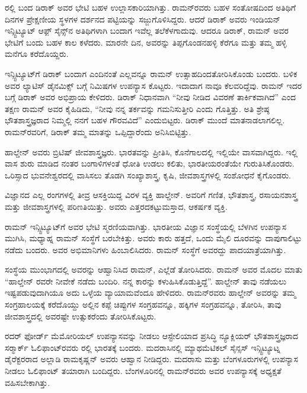 
ರಲ್ಲಿ ಬಂದ ಡಿರಾಕ್ ಅವರ ಭೇಟಿ ಬಹಳ ಉಲ್ಲಾಸಕಾರಿಯಾಗಿತ್ತು. ರಾಮನ್‍ರವರು ಬಹಳ ಸಂತೋಷದಿಂದ ಅತಿಥಿಗೆ \enginline{-}ದಿನಗಳ ಪ್ರೇಕ್ಷಣೀಯ ಸ್ಥಳಗಳ ದರ್ಶನದ ಪಟ್ಟಿಯನ್ನು ಸಜ್ಜುಗೊಳಿಸಿದ್ದರು. ಆದರೆ ಡಿರಾಕ್ ಅವರು ಇಂಡಿಯನ್ ಇನ್ಸ್ಟಿಟ್ಯೂಟ್ ಆಫ಼್ ಸೈನ್ಸ್‌ನ ಅತಿಥಿಗಳಾಗಿ ಬಂದಾಗ ಇವೆಲ್ಲ ತಲೆಕೆಳಗಾದುವು. ಆದರೂ ಡಿರಾಕ್, ರಾಮನ್ ಅವರ ಭೇಟಿಗೆ ಬಂದು ಬಹಳ ಕಾಲ ಕಳೆದರು. ಮಾರನೇ ದಿನ, ಅವರನ್ನು ತಿಪ್ಪಗೊಂಡನಹಳ್ಳಿ ಕೆರೆಗೂ ಮತ್ತು ತಮ್ಮ ಹಳ್ಳಿ ಮನೆಗೂ ಕರೆದೊಯ್ದರು.

ಇನ್ಸ್ಟಿಟ್ಯೂಟ್‍ಗೆ ಡಿರಾಕ್ ಬಂದಾಗ ಎಂದಿನಂತೆ ಎಲ್ಲವನ್ನೂ ರಾಮನ್ ಉತ್ಸಾಹದಿಂದ\break ತೋರಿಸಿಕೊಂಡು ಬಂದರು. ಬಳಿಕ ಅವರ ಲ್ಯಾಟಿಸ್ ಡೈನಮಿಕ್ಸ್ ಬಗ್ಗೆ  ನಿಮಿಷಗಳ ಉಪನ್ಯಾಸ ಕೊಟ್ಟರು. ಇದಾದಾಗ ನಾವೂ ಕೆಲವರಿದ್ದೆವು. ರಾಮನ್ ಇದರ ಬಗ್ಗೆ ಡಿರಾಕ್ ಅವರ ಅಭಿಪ್ರಾಯ ಕೇಳಿದರು. ಡಿರಾಕ್ ನಿಧಾನವಾಗಿ “ನೀವು ನೀಡಿದ ವಿವರಣೆ ತಾರ್ಕಿಕವಾಗಿದೆ” ಎಂದ ತಕ್ಷಣ ರಾಮನ್ ಅವರ ಕೈಹಿಡಿದು, “ನೀವು ನನ್ನ ತರ್ಕವನ್ನು ಗಮನಿಸುತ್ತೀರಿ ಎಂದು ಗೊತ್ತಿತ್ತು. ಅತಿ ಶ್ರೇಷ್ಠ ಭೌತಶಾಸ್ತ್ರಜ್ಞರಾದ ನಿಮ್ಮಲ್ಲಿ ನನಗೆ ಬಹಳ ಗೌರವವಿದೆ” ಎಂದುಬಿಟ್ಟರು. ಡಿರಾಕ್ ಮುಂದೆ ಮಾತನಾಡಲಾಗಲಿಲ್ಲ. ರಾಮನ್‍ರವರಿಗೆ, ಡಿರಾಕ್ ತಮ್ಮ ಮಾತನ್ನು ಒಪ್ಪಿದ್ದಾರೆಂದು ಅನಿಸಿಬಿಟ್ಟಿತ್ತು.



ಹಾಲ್ಡೇನ್ ಅವರು ಬ್ರಿಟಿಷ್ ಜೀವಶಾಸ್ತ್ರಜ್ಞರು. ಭಾರತವನ್ನು ಪ್ರೀತಿಸಿ, ಕೊನೆಗಾಲದಲ್ಲಿ ಇಲ್ಲಿಯೇ ವಾಸವಾಗಿದ್ದರು. ಇಲ್ಲಿ ವಾಸ ಶುರು ಮಾಡಿದ ನಂತರ ಬಂಗಾಳಿಗಳಂತೆ ಧೋತಿ ಉಡಲು ಕಲಿತು, ಭಾರತೀಯರಂತೆಯೇ ಗುರುತಿಸಿಕೊಂಡರು. ಒರಿಸ್ಸಾದ ಭುವನೇಶ್ವರದಲ್ಲಿ ವಾಸಿಸಲು ತೊಡಗಿ ಸಂಖ್ಯಾಶಾಸ್ತ್ರ, ಕೃಷಿ, ಜೀವಶಾಸ್ತ್ರಗಳಲ್ಲಿ ಸಂಶೋಧನೆ ಕೈಗೊಂಡರು.

ವಿಜ್ಞಾನದ ಎಲ್ಲ ರಂಗಗಳಲ್ಲಿ ತೀವ್ರ ಆಸಕ್ತಿಯಿದ್ದ ವಿರಳ ವ್ಯಕ್ತಿ ಹಾಲ್ಡೇನ್. ಅವರಿಗೆ ಗಣಿತ, ಭೌತಶಾಸ್ತ್ರ, ರಸಾಯನಶಾಸ್ತ್ರ ಮತ್ತು ಜೀವಶಾಸ್ತ್ರಗಳಲ್ಲಿ ಪರಿಣತಿಯಿತ್ತು. ಅವರು ಎತ್ತರದ\break ಕಟ್ಟುಮಸ್ತಾದ, ಆಕರ್ಷಕ ವ್ಯಕ್ತಿ.

ರಾಮನ್ ಇನ್ಸ್ಟಿಟ್ಯೂಟ್‍ಗೆ ಅವರ ಭೇಟಿ ಸ್ಮರಣಿಯವಾಗಿತ್ತು. ಭಾರತೀಯ ವಿಜ್ಞಾನ ಸಂಸ್ಥೆಯಲ್ಲಿ ಬೆಳಗಿನ ಉಪನ್ಯಾಸ ಮುಗಿಸಿ, ಮಧ್ಯಾಹ್ನ ರಾಮನ್ ಸಂಸ್ಥೆಗೆ ಬರಬೇಕಿತ್ತು. ಅವರು ಕಾರು ಹತ್ತದೆ, ಒಂದು ಮೈಲಿ ದೂರವನ್ನು ದಾಪುಗಾಲಿಟ್ಟು ನಡೆದು ಬಂದರು. ಅವರ ಅಭಿಮಾನಿಗಳು ಹಿಂಬಾಲಿಸಿದರು. ರಾಮನ್ ಸಂಸ್ಥೆಗೆ ಅವರದ್ದು ಪಾದಯಾತ್ರೆಯಾಗಿತ್ತು.

ಸಂಸ್ಥೆಯ ಮುಂಭಾಗದಲ್ಲಿ ಅವರನ್ನು ಆಹ್ವಾನಿಸಿದ ರಾಮನ್, ಎಲ್ಲೆಡೆ ತೋರಿಸಿದರು. ರಾಮನ್ ಅವರ ಮೊದಲ ಮಾತು “ಹಾಲ್ಡೇನ್ ರವರೇ ನೀವೇಕೆ ನಡೆದು ಬಂದಿರಿ. ನನ್ನ ಕಾರನ್ನು ಕಳುಹಿಸಿಕೊಡುತ್ತಿದ್ದೆ”. ಹಾಲ್ಡೇನ್ ತಾವು ನಡೆಯಲು ಇಷ್ಟಪಡುವುದಾಗಿಯೂ ಅದು ಒಳ್ಳೆಯ ವ್ಯಾಯಾಮವೆಂದೂ ಹೇಳಿದರು. ರಾಮನ್‍ರವರು ಹಾಲ್ಡೇನ್ ಅವರನ್ನು ತಮ್ಮ ಸಂಗ್ರಹಾಲಯಕ್ಕೆ ಕರೆದೊಯ್ದು ಅಲ್ಲಿನ ಕಪ್ಪೆ ಚಿಪ್ಪುಗಳ ಸಂಗ್ರಹವನ್ನೂ, ಹಕ್ಕಿಗಳ ಸಂಗ್ರಹವನ್ನೂ, ತೋರಿಸಿ, ತಾವು ಜೀವಶಾಸ್ತ್ರದಲ್ಲಿ ಅವರಷ್ಟೇ ಉತ್ಸುಕರೆಂದು ತೋರಿಸಿಕೊಟ್ಟರು.



ರದರ್ ಫೋರ್ಡ್ ಮೆಮೋರಿಯಲ್ ಉಪನ್ಯಾಸವನ್ನು ನೀಡಲು ಆಸ್ಟೇಲಿಯಾದ ಪ್ರಸಿದ್ಧಿ ನ್ಯೂಕ್ಲಿಯರ್ ಭೌತಶಾಸ್ತ್ರಜ್ಞರಾದ ಸರ್‍ಮಾರ್ಕ್ ಓಲಿಫಾಂಟ್‍ರವರು ರಲ್ಲಿ ಭಾರತಕ್ಕೆ ಬಂದರು. ಮದರಾಸಿನಲ್ಲಿ ಮ್ಯಾಥಮೆಟಿಕಲ್ ಸೈನ್ಸಸ್ ಇನ್ಸ್ಟಿಟ್ಯೂಟ್ನ ಡೈರೆಕ್ಟರರಾದ ಅಲ್ಲಾಡಿ ರಾಮಕೃಷ್ಣನ್ ಅವರು ಆಹ್ವಾನ ನೀಡಿದ್ದರು. ಮದರಾಸು ಮತ್ತು ಬೆಂಗಳೂರುಗಳಲ್ಲಿ ಉಪನ್ಯಾಸ ನೀಡಲು ಓಲಿಫಾಂಟ್ ತಯಾರಾಗಿ ಬಂದಿದ್ದರು. ಬೆಂಗಳೂರಿನಲ್ಲಿ ರಾಮನ್‍ರವರು ಅವರ ಉಪನ್ಯಾಸಕ್ಕೆ ಅಧ್ಯಕ್ಷತೆ ವಹಿಸಬೇಕಾಗಿತ್ತು.

